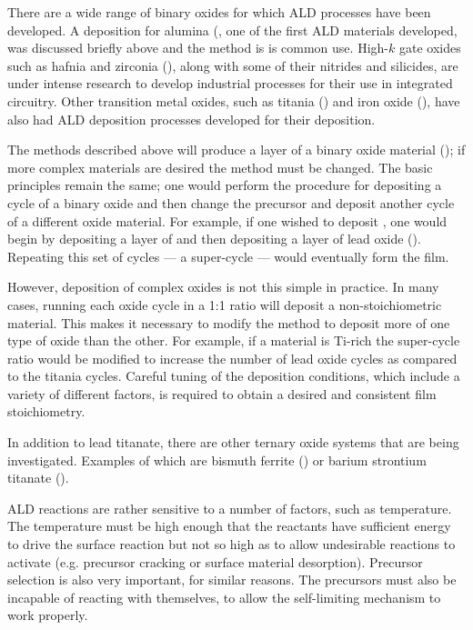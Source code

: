 There are a wide range of binary oxides for which ALD processes have been developed. A deposition for alumina (, one of the first ALD materials developed, was discussed briefly above and the method is is common use.\cite{lee_al2o3_2003,puurunen_surface_2005} High-$k$ gate oxides such as hafnia and zirconia (), along with some of their nitrides and silicides, are under intense research to develop industrial processes for their use in integrated circuitry.\cite{toriumi_application_2008,chen_atomic_2007} Other transition metal oxides, such as titania () and iron oxide (), have also had ALD deposition processes developed for their deposition. \cite{lim_atomic_2003,scheffe_atomic_2009}

The methods described above will produce a layer of a binary oxide material (); if more complex materials are desired the method must be changed. The basic principles remain the same; one would perform the procedure for depositing a cycle of a binary oxide and then change the precursor and deposit another cycle of a different oxide material. For example, if one wished to deposit \PTO{}, one would begin by depositing a layer of  and then depositing a layer of lead oxide (). Repeating this set of cycles --- a super-cycle --- would eventually form the \PTO{} film. 

However, deposition of complex oxides is not this simple in practice. In many cases, running each oxide cycle in a 1:1 ratio will deposit a non-stoichiometric material. This makes it necessary to modify the method to deposit more of one type of oxide than the other. For example, if a material is Ti-rich the super-cycle ratio would be modified to increase the number of lead oxide cycles as compared to the titania cycles. Careful tuning of the deposition conditions, which include a variety of different factors, is required to obtain a desired and consistent film stoichiometry. 

In addition to lead titanate, there are other ternary oxide systems that are being investigated. Examples of which are bismuth ferrite () or barium strontium titanate ().\cite{chu_nanoscale_2009}

ALD reactions are rather sensitive to a number of factors, such as temperature. The temperature must be high enough that the reactants have sufficient energy to drive the surface reaction but not so high as to allow undesirable reactions to activate (e.g. precursor cracking or surface material desorption). Precursor selection is also very important, for similar reasons. The precursors must also be incapable of reacting with themselves, to allow the self-limiting mechanism to work properly.\cite{ALD-Handbook}


